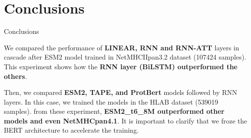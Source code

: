 \documentclass[10pt]{beamer}
\newcommand{\1}{
	\setbeamertemplate{background}{
		\texttt{[image: img/1]}
		\tikz[overlay] \fill[fill opacity=0.75,fill=white] (0,0) rectangle (-\paperwidth,\paperheight);
	}
}
\begin{document}








\section{Conclusions}


\begin{frame}{Conclusions}{}
	
	\begin{block}{}
		We compared the performance of \textbf{LINEAR, RNN and RNN-ATT} layers in cascade after ESM2 model trained in NetMHCIIpan3.2 dataset (107424 samples). This experiment shows how the \textbf{RNN layer (BiLSTM) outperformed the others}.
	\end{block}

	\begin{block}{}
		Then, we compared \textbf{ESM2, TAPE, and ProtBert} models followed by RNN layers. In this case, we trained the models in the HLAB dataset (539019 samples). from these experiment, \textbf{ESM2\_t6\_8M outperformed other models and even NetMHCpan4.1}. It is important to clarify that we froze the BERT architecture to accelerate the training.
	\end{block}

\end{frame}
\end{document}
